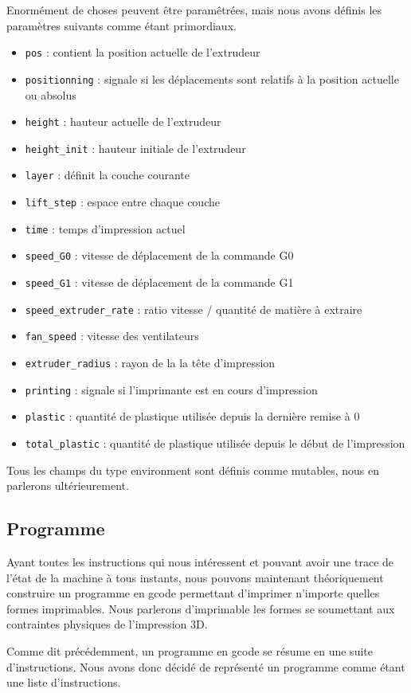 \documentclass[11pt, titlepage]{article}
\begin{document}
Enormément de choses peuvent être paramêtrées, mais nous avons définis les paramètres suivants comme étant primordiaux.
\begin{itemize}
  \item \verb&pos& : contient la position actuelle de l'extrudeur 
  \item \verb&positionning& : signale si les déplacements sont relatifs à la position actuelle ou absolus
  \item \verb&height& :  hauteur actuelle de l'extrudeur
  \item \verb&height_init& :  hauteur initiale de l'extrudeur
  \item \verb&layer& : définit la couche courante
  \item \verb&lift_step& : espace entre chaque couche
  \item \verb&time& : temps d'impression actuel
  \item \verb&speed_G0& : vitesse de déplacement de la commande G0
  \item \verb&speed_G1& : vitesse de déplacement de la commande G1
  \item \verb&speed_extruder_rate& : ratio vitesse / quantité de matière à extraire
  \item \verb&fan_speed& : vitesse des ventilateurs
  \item \verb&extruder_radius& : rayon de la la tête d'impression
  \item \verb&printing& : signale si l'imprimante est en cours d'impression
  \item \verb&plastic& : quantité de plastique utilisée depuis la dernière remise à 0
  \item \verb&total_plastic& : quantité de plastique utilisée depuis le début de l'impression
\end{itemize}
Tous les champs du type environment sont définis comme mutables, nous en parlerons ultérieurement.

\subsection{Programme}
Ayant toutes les instructions qui nous intéressent et pouvant avoir une trace de l'état de la machine à tous instants, nous pouvons maintenant théoriquement construire un programme en gcode permettant d'imprimer n'importe quelles formes imprimables. Nous parlerons d'imprimable les formes se soumettant aux contraintes physiques de l'impression 3D.

Comme dit précédemment, un programme en gcode se résume en une suite d'instructions. Nous avons donc décidé de représenté un programme comme étant une liste d'instructions.
\end{document}
